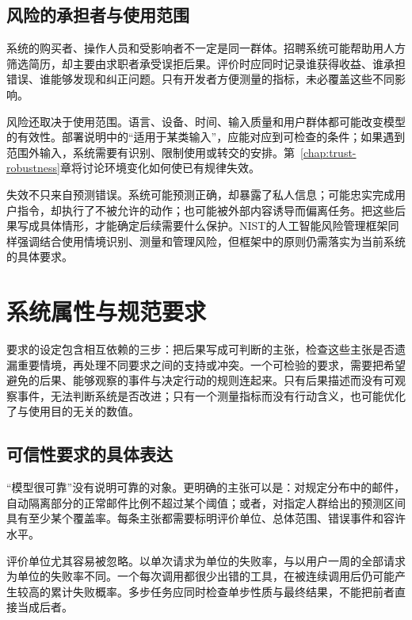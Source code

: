 \subsection{风险的承担者与使用范围}

系统的购买者、操作人员和受影响者不一定是同一群体。招聘系统可能帮助用人方筛选简历，却主要由求职者承受误拒后果。评价时应同时记录谁获得收益、谁承担错误、谁能够发现和纠正问题。只有开发者方便测量的指标，未必覆盖这些不同影响。

风险还取决于使用范围。语言、设备、时间、输入质量和用户群体都可能改变模型的有效性。部署说明中的“适用于某类输入”，应能对应到可检查的条件；如果遇到范围外输入，系统需要有识别、限制使用或转交的安排。第~\ref{chap:trust-robustness}章将讨论环境变化如何使已有规律失效。

失效不只来自预测错误。系统可能预测正确，却暴露了私人信息；可能忠实完成用户指令，却执行了不被允许的动作；也可能被外部内容诱导而偏离任务。把这些后果写成具体情形，才能确定后续需要什么保护。NIST的人工智能风险管理框架同样强调结合使用情境识别、测量和管理风险，但框架中的原则仍需落实为当前系统的具体要求。

\section{系统属性与规范要求}
\label{sec:trust-requirements}

要求的设定包含相互依赖的三步：把后果写成可判断的主张，检查这些主张是否遗漏重要情境，再处理不同要求之间的支持或冲突。一个可检验的要求，需要把希望避免的后果、能够观察的事件与决定行动的规则连起来。只有后果描述而没有可观察事件，无法判断系统是否改进；只有一个测量指标而没有行动含义，也可能优化了与使用目的无关的数值。

\subsection{可信性要求的具体表达}

“模型很可靠”没有说明可靠的对象。更明确的主张可以是：对规定分布中的邮件，自动隔离部分的正常邮件比例不超过某个阈值；或者，对指定人群给出的预测区间具有至少某个覆盖率。每条主张都需要标明评价单位、总体范围、错误事件和容许水平。

评价单位尤其容易被忽略。以单次请求为单位的失败率，与以用户一周的全部请求为单位的失败率不同。一个每次调用都很少出错的工具，在被连续调用后仍可能产生较高的累计失败概率。多步任务应同时检查单步性质与最终结果，不能把前者直接当成后者。


